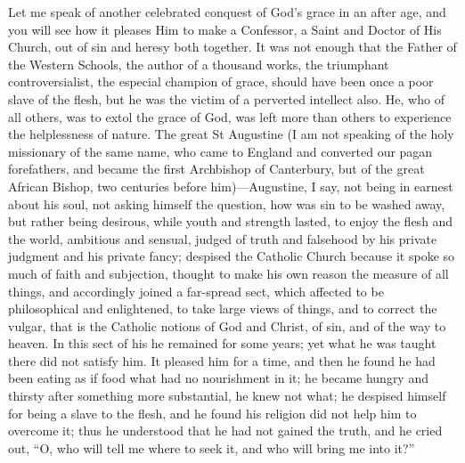 Let me speak of another celebrated conquest of God's grace in an
after age, and you will see how it pleases Him to make a Confessor, a
Saint and Doctor of His Church, out of sin and heresy both together.
It was not enough that the Father of the Western Schools, the author
of a thousand works, the triumphant controversialist, the especial
champion of grace, should have been once a poor slave of the flesh,
but he was the victim of a perverted intellect also. He, who of all
others, was to extol the grace of God, was left more than others to
experience the helplessness of nature. The great St Augustine (I am
not speaking of the holy missionary of the same name, who came to
England and converted our pagan forefathers, and became the first
Archbishop of Canterbury, but of the great African Bishop, two
centuries before him)—Augustine, I say, not being in earnest about
his soul, not asking himself the question, how was sin to be washed
away, but rather being desirous, while youth and strength lasted, to
enjoy the flesh and the world, ambitious and sensual, judged of truth
and falsehood by his private judgment and his private fancy; despised
the Catholic Church because it spoke so much of faith and subjection,
thought to make his own reason the measure of all things, and
accordingly joined a far-spread sect, which affected to be
philosophical and enlightened, to take large views of things, and to
correct the vulgar, that is the Catholic notions of God and Christ, of
sin, and of the way to heaven. In this sect of his he remained for
some years; yet what he was taught there did not satisfy him. It
pleased him for a time, and then he found he had been eating as if
food what had no nourishment in it; he became hungry and thirsty after
something more substantial, he knew not what; he despised himself for
being a slave to the flesh, and he found his religion did not help him
to overcome it; thus he understood that he had not gained the truth,
and he cried out, ``O, who will tell me where to seek it, and who
will bring me into it?''

